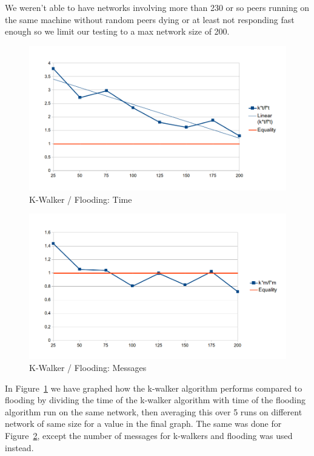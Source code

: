 We weren't able to have networks involving more than 230 or so peers running on the same machine without random peers dying or at least not responding fast enough so we limit our testing to a max network size of 200.

\begin{figure}
\caption{K-Walker / Flooding: Time}
\label{graph_fvsk_t}
\includegraphics[width=\textwidth]{../Grapes/flooding_vs_kwalker_time_graph.png}
\end{figure}

\begin{figure}
\caption{K-Walker / Flooding: Messages}
\label{graph_fvsk_m}
\includegraphics[width=\textwidth]{../Grapes/flooding_vs_kwalker_messages_graph.png}
\end{figure}

In Figure~\ref{graph_fvsk_t} we have graphed how the k-walker algorithm performs compared to flooding by dividing the time of the k-walker algorithm with time of the flooding algorithm run on the same network, then averaging this over 5 runs on different network of same size for a value in the final graph. The same was done for Figure~\ref{graph_fvsk_m}, except the number of messages for k-walkers and flooding was used instead.

